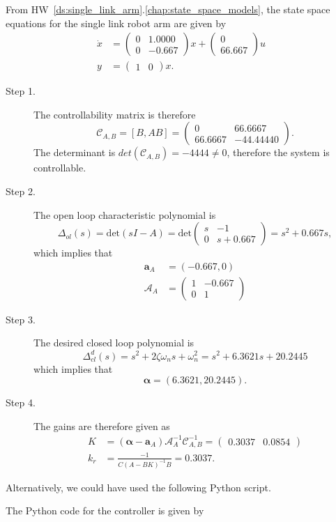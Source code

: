 
From HW~\ref{ds:single_link_arm}.\ref{chap:state_space_models}, the state space equations for the single link robot arm are given by
\begin{align*}
\dot{x} &= \begin{pmatrix} 0 &   1.0000 \\ 0 &  -0.667 \end{pmatrix}x + \begin{pmatrix} 0 \\ 66.667 \end{pmatrix} u \\
y &= \begin{pmatrix}1 & 0 \end{pmatrix}x.
\end{align*}
\begin{description}
\item[Step 1.] 
The controllability matrix is therefore
\[
\mathcal{C}_{A,B} = [B, AB] = \begin{pmatrix}  0 & 66.6667 \\ 66.6667 &  -44.44440 \end{pmatrix}.
\]
The determinant is $det(\mathcal{C}_{A,B})=-4444\neq 0$, therefore the system is controllable.  
\item[Step 2.] The open loop characteristic polynomial is
\[
\Delta_{ol}(s)=\text{det}(sI-A) = \text{det}\begin{pmatrix} s & -1 \\ 0 & s+0.667 \end{pmatrix} = s^2 +0.667 s,
\]
which implies that
\begin{align*}
\mathbf{a}_A &= (-0.667, 0) \\
\mathcal{A}_A &= \begin{pmatrix} 
1 & -0.667 \\ 0 & 1
\end{pmatrix}
\end{align*}

\item[Step 3.] The desired closed loop polynomial is
\[
\Delta_{cl}^d(s) = s^2+2\zeta\omega_n s + \omega_n^2=s^2+6.3621s+20.2445       
\]
which implies that
\[
\boldsymbol{\alpha} = (6.3621, 20.2445).
\]

\item[Step 4.]
The gains are therefore given as
\begin{align*}
K &= (\boldsymbol{\alpha}-\mathbf{a}_A)\mathcal{A}_A^{-1}\mathcal{C}_{A,B}^{-1} 
   = \begin{pmatrix} 0.3037  &  0.0854 \end{pmatrix} \\
k_r &= \frac{-1}{C(A-BK)^{-1}B} 
     = 0.3037.
\end{align*}
\end{description}

Alternatively, we could have used the following Python script.


The Python code for the controller is given by




